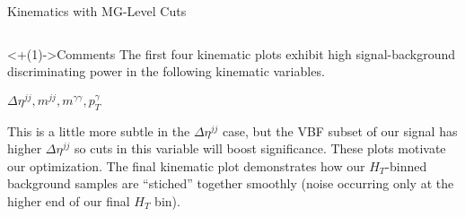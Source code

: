 \documentclass[]{beamer}
\begin{document}
\begin{frame}{Kinematics with MG-Level Cuts}
    \begin{columns}
    \end{columns}
    \begin{columns}
    \end{columns}
    \begin{block}<+(1)->{Comments}
        The first four kinematic plots exhibit high signal-background discriminating power in the following kinematic variables.
        
        \smallskip
        
        $\Delta \eta^{jj}, m^{jj}, m^{\gamma \gamma}, p_T^{\gamma}$
        
        \smallskip
        
        This is a little more subtle in the $\Delta \eta^{jj}$ case, but the VBF subset of our signal has higher $\Delta \eta^{jj}$ so cuts in this variable will boost significance. These plots motivate our optimization. The final kinematic plot demonstrates how our $H_T$-binned background samples are ``stiched'' together smoothly (noise occurring only at the higher end of our final $H_T$ bin).
    \end{block}
\end{frame}
\end{document}
